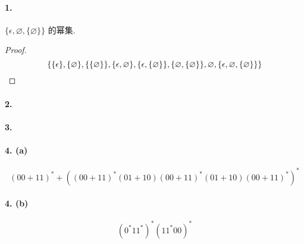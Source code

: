 \documentclass[12pt]{ctexart}
\theoremstyle{definition}
\theoremstyle{definition}
\theoremstyle{plain}
\theoremstyle{remark}
\begin{document}
\paragraph{1. } \(\{ \epsilon , \varnothing, \{ \varnothing \}\}\) 的幂集. 
\begin{proof}
\[
\{ 
	\{ \epsilon \} , \{ \varnothing \} , \{ \{ \varnothing \}\} ,
	\{ \epsilon , \varnothing  \},  \{ \epsilon , \{ \varnothing  \} \} , \{ \varnothing  , \{ \varnothing  \}\} , 
	\varnothing  , \{ \epsilon , \varnothing , \{ \varnothing  \} \} 
\} \qedhere
\]
\end{proof}

\paragraph{2. } 

\paragraph{3. }

\paragraph{4. (a)}
% 
% 


\[
	( 00 + 11 ) ^{ *} + ((00 + 11 )^{*} ( 01 + 10 )( 00 + 11 ) ^{*} (01 + 10 ) ( 00 + 11) ^{*}  )^{*}
\]



\paragraph{4. (b)}

\[
	(0^{*} 1 1 ^{*} ) ^{*} (1 1 ^{*} 00 ) ^{*}
\]


\end{document}
